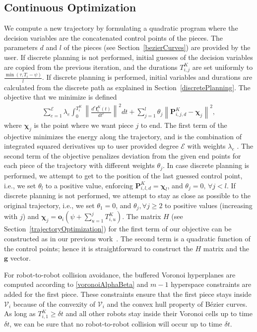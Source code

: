 \documentclass{svproc}
\newcommand{\vP}{\mathbf{P}}
\newcommand{\vg}{\mathbf{g}}
\newcommand{\vf}{\mathbf{f}}
\newcommand{\vo}{\mathbf{o}}
\newcommand{\vchi}{\mathbf{\chi}}
\newcommand{\cV}{\mathcal{V}}
\newcommand{\cE}{\mathcal{E}}
\begin{document}
\subsection{Continuous Optimization}\label{continuousOptimization}
We compute a new trajectory by formulating a quadratic program where the decision variables are the concatenated control points of the pieces.
The parameters $d$ and $l$ of the pieces (see Section~\ref{bezierCurves}) are provided by the user.
If discrete planning is not performed, initial guesses of the decision variables are copied from the previous iteration, and the durations $T^{K}_{i,j}$ are set uniformly to $\frac{\min(\tau,T_i-\psi)}{l}$.
If discrete planning is performed, initial variables and durations are calculated from the discrete path as explained in Section~\ref{discretePlanning}.
The objective that we minimize is defined 
\begin{align}
    \sum_{e=1}^{\cE} \lambda_e\int_{0}^{T^K_i} \left\|\frac{d^e\vf^{K}_i(t)}{dt^e}\right\|^2dt + \sum_{j=1}^{l} \theta_j \left\|\vP^{K}_{i,j,d} - \vchi_{j}\right\|^2, \label{costFunction}
\end{align}
where $\vchi_j$ is the point  where we want piece $j$ to end.
The first term of the objective minimizes the energy along the trajectory, and is the combination of integrated squared derivatives up to user provided degree $\cE$ with weights $\lambda_e$ \cite{crazyplanning-ieeetro,richterISRR}.
The second term of the objective penalizes deviation from the given end points for each piece of the trajectory with different weights $\theta_j$.
In case discrete planning is performed, we attempt to get to the position of the last guessed control point, i.e., we set $\theta_l$ to a positive value, enforcing $\vP^K_{i,l,d} = \vchi_l$, and $\theta_j = 0,\,\forall j < l$.
If discrete planning is not performed, we attempt to stay as close as possible to the original trajectory, i.e.,  we set $\theta_1 = 0$, and $\theta_j, \forall j \geq 2$ to positive values (increasing with $j$) and $\vchi_j = \vo_i(\psi + \sum_{u=1}^j T^{K}_{i,u})$.
The matrix $H$ (see Section~\ref{trajectoryOptimization}) for the first term of our objective can be constructed as in our previous work~\cite{crazyplanning-ieeetro}.
The second term is a quadratic function of the control points; hence it is straightforward to construct the $H$ matrix and the $\vg$ vector.

For robot-to-robot collision avoidance, the buffered Voronoi hyperplanes are computed according to \eqref{voronoiAlphaBeta} and $m-1$ hyperspace constraints are added for the first piece.
These constraints ensure that the first piece stays inside $\cV_i$ because of the convexity of $\cV_i$ and the convex hull property of B\'ezier curves.
As long as $T^{K}_{i,1} \geq \delta t$ and all other robots stay inside their Voronoi cells up to time $\delta t$, we can be sure that no robot-to-robot collision will occur up to time $\delta t$.
\end{document}
